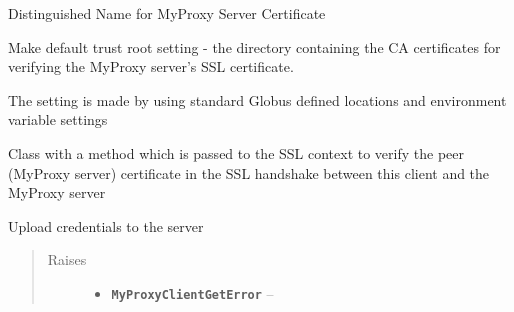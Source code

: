 \documentclass[letterpaper,10pt,english]{sphinxmanual}
\begin{document}
\begin{fulllineitems}
\begin{fulllineitems}
\begin{quote}
\begin{description}
\end{description}\end{quote}

\end{fulllineitems}


\begin{fulllineitems}
\label{client:myproxy.client.MyProxyClient.serverDN}
Distinguished Name for MyProxy Server Certificate

\end{fulllineitems}


\begin{fulllineitems}
\label{client:myproxy.client.MyProxyClient.setDefaultCACertDir}
Make default trust root setting - the directory containing the CA 
certificates for verifying the MyProxy server's SSL certificate.

The setting is made by using standard Globus defined locations and
environment variable settings

\end{fulllineitems}


\begin{fulllineitems}
\label{client:myproxy.client.MyProxyClient.ssl_verification}
Class with a method which is passed to the SSL context to verify the peer (MyProxy server) certificate in the SSL handshake between this client and the MyProxy server

\end{fulllineitems}


\begin{fulllineitems}
\label{client:myproxy.client.MyProxyClient.store}
Upload credentials to the server
\begin{quote}\begin{description}
\item[{Raises}] \leavevmode\begin{itemize}
\item {} 
\textbf{\texttt{MyProxyClientGetError}} -- 


\end{itemize}
\end{description}
\end{quote}
\end{fulllineitems}
\end{fulllineitems}
\end{document}

